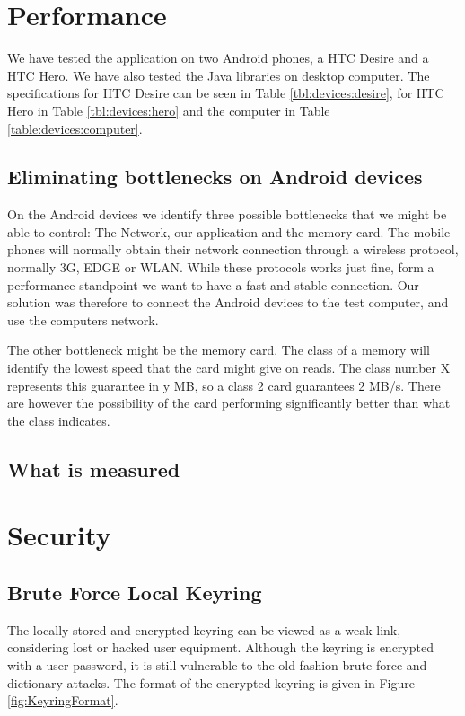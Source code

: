 \documentclass[pdftex,english,10pt,b5paper,twoside]{book}
\begin{document}
\section{Performance}
We have tested the application on two Android phones, a HTC Desire and a HTC
Hero. We have also tested the Java libraries on desktop computer. The
specifications for HTC Desire can be seen in Table \ref{tbl:devices:desire},
for HTC Hero in Table \ref{tbl:devices:hero} and the computer in Table
\ref{table:devices:computer}.





\subsection{Eliminating bottlenecks on Android devices}
On the Android devices we identify three possible bottlenecks that we might be
able to control: The Network, our application and the memory card. The mobile
phones will normally obtain their network connection through a wireless
protocol, normally 3G, EDGE or WLAN. While these protocols works just fine,
form a performance standpoint we want to have a fast and stable connection. Our
solution was therefore to connect the Android devices to the test computer, and
use the computers network.

The other bottleneck might be the memory card. The class of a memory will
identify the lowest speed that the card might give on reads. The class number X
represents this guarantee in y MB, so a class 2 card guarantees 2 MB/s. There
are however the possibility of the card performing significantly better than
what the class indicates.

\subsection{What is measured}

\section{Security}

\subsection{Brute Force Local Keyring}
\label{sec:BFLK}
The locally stored and encrypted keyring can be viewed as a weak link, considering lost or hacked user
equipment. Although the keyring is encrypted with a user password, it is still
vulnerable to the old fashion brute force and dictionary attacks. The format of
the encrypted keyring is given in Figure \ref{fig:KeyringFormat}. 
\end{document}
